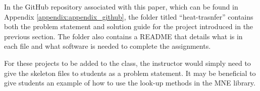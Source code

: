 In the GitHub repository associated with this paper, which can be found in 
Appendix \ref{appendix:appendix_github}, the folder titled ``heat-trasnfer''
contains both the problem statement and solution guide for the project introduced in 
the previous section. The folder also contains a README that details what is in each file and 
what software is needed to complete the assignments. 

For these projects to be added to the class, the instructor would simply need to give the 
skeleton files to students as a problem statement. It may be beneficial to give students 
an example of how to use the look-up methods in the MNE library. 
